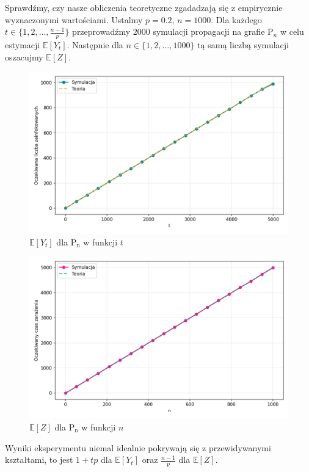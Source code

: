 Sprawdźmy, czy nasze obliczenia teoretyczne zgadadzają się z empirycznie wyznaczonymi wartościami. Ustalmy $p=0.2$, $n=1000$. Dla każdego $t\in\{1, 2, \dots, \frac{n-1}{p}\}$ przeprowadźmy $2000$ symulacji propagacji na grafie $\mathrm{P}_n$ w celu estymacji $\mathbb{E}[Y_t]$. Następnie dla $n\in\{1,2,\dots,1000\}$ tą samą liczbą symulacji oszacujmy $\mathbb{E}[Z]$. 
\begin{figure}[ht!]
    \centering
    \includegraphics[width=1\textwidth]{../img/path/final_infection_expectations.png}
    \caption{$\mathbb{E}[Y_t]$ dla $\mathrm{P_n}$ w funkcji $t$}
\end{figure}
\begin{figure}[ht!]
    \centering
    \includegraphics[width=1\textwidth]{../img/path/full_infection_expectation.png}
    \caption{$\mathbb{E}[Z]$ dla $\mathrm{P_n}$ w funkcji $n$}
\end{figure}
Wyniki eksperymentu niemal idealnie pokrywają się z przewidywanymi kształtami, to jest $1+tp$ dla $\mathbb{E}[Y_t]$ oraz $\frac{n-1}{p}$ dla $\mathbb{E}[Z]$.



